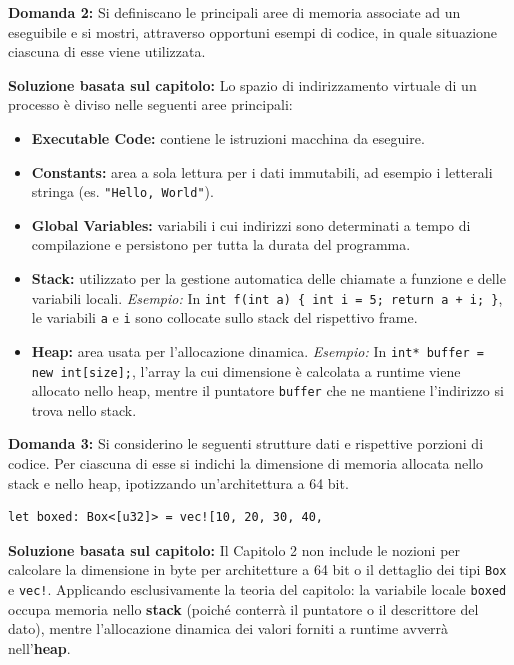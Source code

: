 \begin{exambox}
\textbf{Domanda 2:} Si definiscano le principali aree di memoria associate ad un eseguibile e si mostri, attraverso opportuni esempi di codice, in quale situazione ciascuna di esse viene utilizzata.
\end{exambox}
\textbf{Soluzione basata sul capitolo:} 
Lo spazio di indirizzamento virtuale di un processo è diviso nelle seguenti aree principali:
\begin{itemize}
    \item \textbf{Executable Code:} contiene le istruzioni macchina da eseguire.
    \item \textbf{Constants:} area a sola lettura per i dati immutabili, ad esempio i letterali stringa (es. \texttt{"Hello, World"}).
    \item \textbf{Global Variables:} variabili i cui indirizzi sono determinati a tempo di compilazione e persistono per tutta la durata del programma.
    \item \textbf{Stack:} utilizzato per la gestione automatica delle chiamate a funzione e delle variabili locali. \textit{Esempio:} In \texttt{int f(int a) \{ int i = 5; return a + i; \}}, le variabili \texttt{a} e \texttt{i} sono collocate sullo stack del rispettivo frame.
    \item \textbf{Heap:} area usata per l'allocazione dinamica. \textit{Esempio:} In \texttt{int* buffer = new int[size];}, l'array la cui dimensione è calcolata a runtime viene allocato nello heap, mentre il puntatore \texttt{buffer} che ne mantiene l'indirizzo si trova nello stack.
\end{itemize}

\begin{exambox}
\textbf{Domanda 3:} Si considerino le seguenti strutture dati e rispettive porzioni di codice. Per ciascuna di esse si indichi la dimensione di memoria allocata nello stack e nello heap, ipotizzando un’architettura a 64 bit.
\begin{verbatim}
let boxed: Box<[u32]> = vec![10, 20, 30, 40,
\end{verbatim}
\end{exambox}
\textbf{Soluzione basata sul capitolo:}
Il Capitolo 2 non include le nozioni per calcolare la dimensione in byte per architetture a 64 bit o il dettaglio dei tipi \texttt{Box} e \texttt{vec!}. Applicando esclusivamente la teoria del capitolo: la variabile locale \texttt{boxed} occupa memoria nello \textbf{stack} (poiché conterrà il puntatore o il descrittore del dato), mentre l'allocazione dinamica dei valori forniti a runtime avverrà nell'\textbf{heap}.

